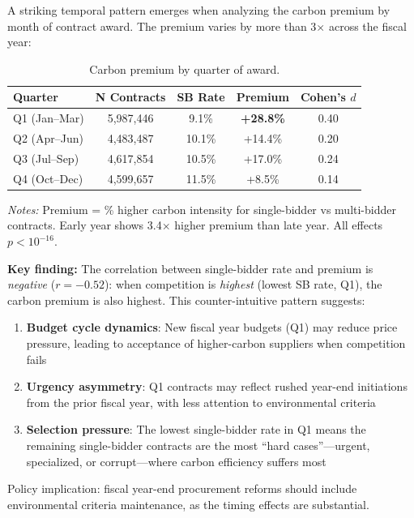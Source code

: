 \documentclass[11pt]{article}
\newcommand{\tabnoteblock}[1]{%
    \par\vspace{0.45em}%
    \begin{minipage}{0.98\linewidth}
    \footnotesize\raggedright #1
    \end{minipage}\par
}
\newcommand{\tabnotes}[1]{\tabnoteblock{\textit{Notes:} #1}}
\begin{document}
A striking temporal pattern emerges when analyzing the carbon premium by month of contract award. The premium varies by more than 3$\times$ across the fiscal year:

\begin{table}[H]
\centering
\caption{Carbon premium by quarter of award.}
\label{tab:fiscalcalendar}
\begin{tabular}{lcccc}
\toprule
\textbf{Quarter} & \textbf{N Contracts} & \textbf{SB Rate} & \textbf{Premium} & \textbf{Cohen's $d$} \\
\midrule
Q1 (Jan--Mar) & 5,987,446 & 9.1\% & \textbf{+28.8\%} & 0.40 \\
Q2 (Apr--Jun) & 4,483,487 & 10.1\% & +14.4\% & 0.20 \\
Q3 (Jul--Sep) & 4,617,854 & 10.5\% & +17.0\% & 0.24 \\
Q4 (Oct--Dec) & 4,599,657 & 11.5\% & +8.5\% & 0.14 \\
\bottomrule
\end{tabular}

\tabnotes{Premium = \% higher carbon intensity for single-bidder vs multi-bidder contracts. Early year shows 3.4$\times$ higher premium than late year. All effects $p < 10^{-16}$.
}
\end{table}

\textbf{Key finding:} The correlation between single-bidder rate and premium is \textit{negative} ($r = -0.52$): when competition is \textit{highest} (lowest SB rate, Q1), the carbon premium is also highest. This counter-intuitive pattern suggests:

\begin{enumerate}
    \item \textbf{Budget cycle dynamics}: New fiscal year budgets (Q1) may reduce price pressure, leading to acceptance of higher-carbon suppliers when competition fails
    \item \textbf{Urgency asymmetry}: Q1 contracts may reflect rushed year-end initiations from the prior fiscal year, with less attention to environmental criteria
    \item \textbf{Selection pressure}: The lowest single-bidder rate in Q1 means the remaining single-bidder contracts are the most ``hard cases''---urgent, specialized, or corrupt---where carbon efficiency suffers most
\end{enumerate}

Policy implication: fiscal year-end procurement reforms should include environmental criteria maintenance, as the timing effects are substantial.
\end{document}
